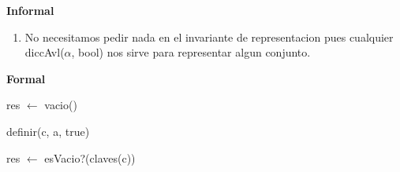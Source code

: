 \disInvarianteDeRepresentacion
\hspace*{\disSubSubSecMargen}\textbf{\textsf{Informal}}
\hspace*{\disSubSubSecMargen}
\begin{enumerate}
\setlength{\itemindent}{3em}
	\item No necesitamos pedir nada en el invariante de representacion pues cualquier diccAvl($\alpha$, bool) nos sirve para representar algun conjunto.
\end{enumerate}


\hspace*{\disSubSubSecMargen}\textbf{\textsf{Formal}}


\disFuncionDeAbstraccion
\vspace*{-1em}


\disAlgoritmos

\begin{algorithm}\phantom{[H]}
\begin{algorithmic}[1]
  \State res $\gets$ vacio() 
\EndFunction
\end{algorithmic}
\end{algorithm}

\begin{algorithm}\phantom{[H]}
\begin{algorithmic}[1]
  \State definir(c, a, true) 
\EndFunction
\end{algorithmic}
\end{algorithm}

\begin{algorithm}\phantom{[H]}
\begin{algorithmic}[1]
 
  \State res $\gets$ esVacio?(claves(c)) 
\EndFunction
\end{algorithmic}
\end{algorithm}

